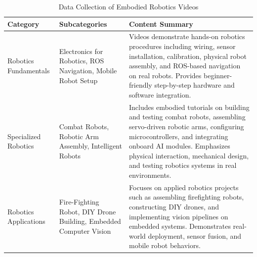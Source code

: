 \begin{table}[ht]
    \centering
    \caption{Data Collection of Embodied Robotics Videos}
    \begin{tabular}{p{3cm} p{3cm} p{7cm}}
        \toprule
        \textbf{Category} & \textbf{Subcategories} & \textbf{Content Summary} \\
        \midrule
        
        Robotics Fundamentals 
        & Electronics for Robotics, ROS Navigation, Mobile Robot Setup 
        & Videos demonstrate hands-on robotics procedures including wiring, sensor installation, calibration, physical robot assembly, and ROS-based navigation on real robots. Provides beginner-friendly step-by-step hardware and software integration. \\[6pt]
        
        Specialized Robotics
        & Combat Robots, Robotic Arm Assembly, Intelligent Robots 
        & Includes embodied tutorials on building and testing combat robots, assembling servo-driven robotic arms, configuring microcontrollers, and integrating onboard AI modules. Emphasizes physical interaction, mechanical design, and testing robotics systems in real environments. \\[6pt]
        
        Robotics Applications
        & Fire-Fighting Robot, DIY Drone Building, Embedded Computer Vision 
        & Focuses on applied robotics projects such as assembling firefighting robots, constructing DIY drones, and implementing vision pipelines on embedded systems. Demonstrates real-world deployment, sensor fusion, and mobile robot behaviors. \\
        
        \bottomrule
    \end{tabular}
    \label{tab:categorized_videos}
\end{table}
         

